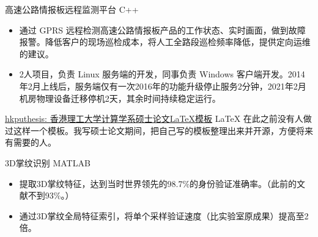 \documentclass[10pt,a4paper]{moderncv}
\begin{document}
{高速公路情报板远程监测平台}
{C++}
{}{}
{
\begin{itemize}
	\item 通过 GPRS 远程检测高速公路情报板产品的工作状态、实时画面，做到故障报警。降低客户的现场巡检成本，将人工全路段巡检频率降低，提供定向运维的建议。
	\item 2人项目，负责 Linux 服务端的开发，同事负责 Windows 客户端开发。2014年2月上线后，服务端仅有一次2016年的功能升级停止服务2分钟，2021年2月机房物理设备迁移停机2天，其余时间持续稳定运行。
\end{itemize}
}



{\href{https://github.com/edwardtoday/hkputhesis}{hkputhesis: 香港理工大学计算学系硕士论文\LaTeX 模板}}
{\LaTeX}
{}{}
{
在此之前没有人做过这样一个模板。我写硕士论文期间，把自己写的模板整理出来并开源，方便将来有需要的人。
}

{3D掌纹识别}
{MATLAB}
{}{}
{
\begin{itemize}
	\item 提取3D掌纹特征，达到当时世界领先的98.7\%的身份验证准确率。（此前的文献不到93\%。）
	\item 通过3D掌纹全局特征索引，将单个采样验证速度（比实验室原成果）提高至2倍。
\end{itemize}
}


\end{document}
